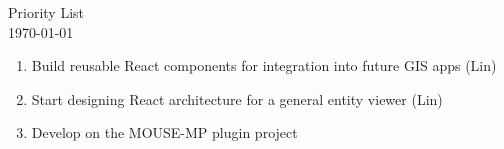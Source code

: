 \documentclass{article}
\begin{document}
\Large Priority List\\
\today
  \begin{enumerate}
    \item Build reusable React components for integration into future GIS apps (Lin)
    \item Start designing React architecture for a general entity viewer (Lin)
    \item Develop on the MOUSE-MP plugin project
  \end{enumerate}
\end{document}
